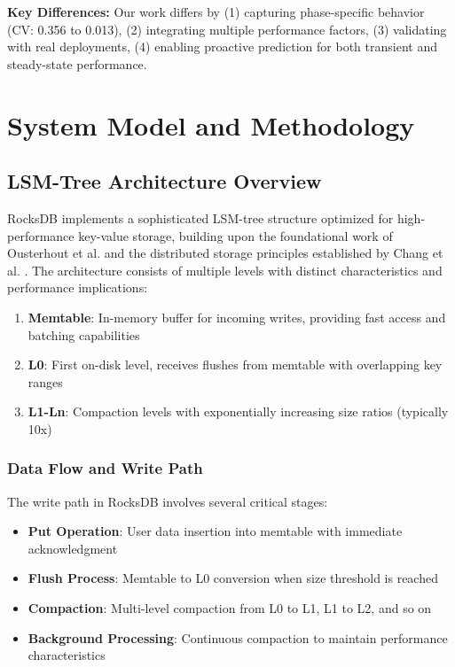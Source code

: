 \documentclass[11pt]{article}
\begin{document}
\textbf{Key Differences:} Our work differs by (1) capturing phase-specific behavior (CV: 0.356 to 0.013), (2) integrating multiple performance factors, (3) validating with real deployments, (4) enabling proactive prediction for both transient and steady-state performance.

\section{System Model and Methodology}
\label{sec:system_model}

\subsection{LSM-Tree Architecture Overview}

RocksDB implements a sophisticated LSM-tree structure optimized for high-performance key-value storage, building upon the foundational work of Ousterhout et al. \cite{ousterhout2013ramcloud} and the distributed storage principles established by Chang et al. \cite{chang2008bigtable}. The architecture consists of multiple levels with distinct characteristics and performance implications:

\begin{enumerate}
    \item \textbf{Memtable}: In-memory buffer for incoming writes, providing fast access and batching capabilities
    \item \textbf{L0}: First on-disk level, receives flushes from memtable with overlapping key ranges
    \item \textbf{L1-Ln}: Compaction levels with exponentially increasing size ratios (typically 10x)
\end{enumerate}

\subsubsection{Data Flow and Write Path}
The write path in RocksDB involves several critical stages:

\begin{itemize}
    \item \textbf{Put Operation}: User data insertion into memtable with immediate acknowledgment
    \item \textbf{Flush Process}: Memtable to L0 conversion when size threshold is reached
    \item \textbf{Compaction}: Multi-level compaction from L0 to L1, L1 to L2, and so on
    \item \textbf{Background Processing}: Continuous compaction to maintain performance characteristics
\end{itemize}
\end{document}
